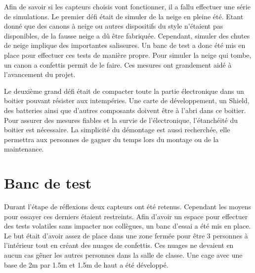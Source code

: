 Afin de savoir si les capteurs choisis vont fonctionner, il a fallu effectuer une série de simulations. 
Le premier défi était de simuler de la neige en pleine été. Etant donné que des canons à neige ou autres 
dispositifs du style n’étaient pas disponibles, de la fausse neige a dû être fabriquée. Cependant, simuler 
des chutes de neige implique des importantes salissures. Un banc de test a donc été mis en place pour effectuer 
ces tests de manière propre. Pour simuler la neige qui tombe, un canon a confettis permit de le faire. 
Ces mesures ont grandement aidé à l’avancement du projet.\par 
Le deuxième grand défi était de compacter toute la partie électronique dans un boitier pouvant résister aux 
intempéries. Une carte de développement, un Shield, des batteries ainsi que d’autres composants doivent être 
à l’abri dans ce boitier. Pour assurer des mesures fiables et la survie de l’électronique, l’étanchéité du 
boitier est nécessaire. La simplicité du démontage est aussi recherchée, elle permettra aux personnes de 
gagner du temps lors du montage ou de la maintenance.

\section{Banc de test}

Durant l’étape de réflexions deux capteurs ont été retenus. Cependant les moyens pour essayer ces derniers 
étaient restreints. Afin d’avoir un espace pour effectuer des tests volatiles sans impacter nos collègues, 
un banc d’essai a été mis en place. \\
Le but était d’avoir assez de place dans une zone fermée pour être 3 personnes à l’intérieur tout en créant 
des nuages de confettis. Ces nuages ne devaient en aucun cas gêner les autres personnes dans la salle de classe. 
Une cage avec une base de 2m par 1.5m et 1.5m de haut a été développé. 


